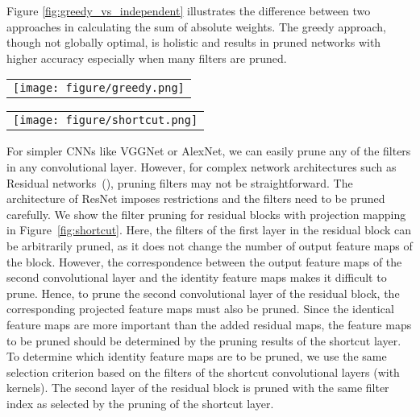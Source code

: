 \documentclass{article} \usepackage{iclr2017_conference,times}
\begin{document}
Figure \ref{fig:greedy_vs_independent} illustrates the difference between two approaches in calculating the sum of absolute weights.
The greedy approach, though not globally optimal, is holistic and results in pruned networks with higher accuracy especially when many filters are pruned.

\begin{figure*}[htbp]
\centering
\begin{tabular}{l}
      \texttt{[image: figure/greedy.png]}
\end{tabular}
\caption{Pruning filters across consecutive layers.
The independent pruning strategy calculates the filter sum (columns marked in green) without considering feature maps removed in previous layer (shown in blue),
so the kernel weights marked in yellow are still included.
The greedy pruning strategy does not count kernels for the already pruned feature maps.
Both approaches result in a  kernel matrix.}
\label{fig:greedy_vs_independent}
\end{figure*}

\begin{figure*}[htbp]
\centering
\begin{tabular}{l}
      \texttt{[image: figure/shortcut.png]}
\end{tabular}
\caption{Pruning residual blocks with the projection shortcut. 
The filters to be pruned for the second layer of the residual block (marked as green) are determined by the pruning result of the shortcut projection.
The first layer of the residual block can be pruned without restrictions.
}
\label{fig:shortcut}
\end{figure*}

For simpler CNNs like VGGNet or AlexNet, we can easily prune any of the filters in any convolutional layer.
However, for complex network architectures such as Residual networks~(\cite{resnet}), pruning filters may not be straightforward.
The architecture of ResNet imposes restrictions and the filters need to be pruned carefully.
We show the filter pruning for residual blocks with projection mapping in Figure~\ref{fig:shortcut}.
Here, the filters of the first layer in the residual block can be arbitrarily pruned, as it does not change the number of output feature maps of the block.
However, the correspondence between the output feature maps of the second convolutional layer and the identity feature maps makes it difficult to prune.
Hence, to prune the second convolutional layer of the residual block, the corresponding projected feature maps must also be pruned.
Since the identical feature maps are more important than the added residual maps, the feature maps to be pruned should be determined by the pruning results of the shortcut layer.
To determine which identity feature maps are to be pruned, we use the same selection criterion based on the filters of the shortcut convolutional layers (with  kernels).
The second layer of the residual block is pruned with the same filter index as selected by the pruning of the shortcut layer.
\end{document}
